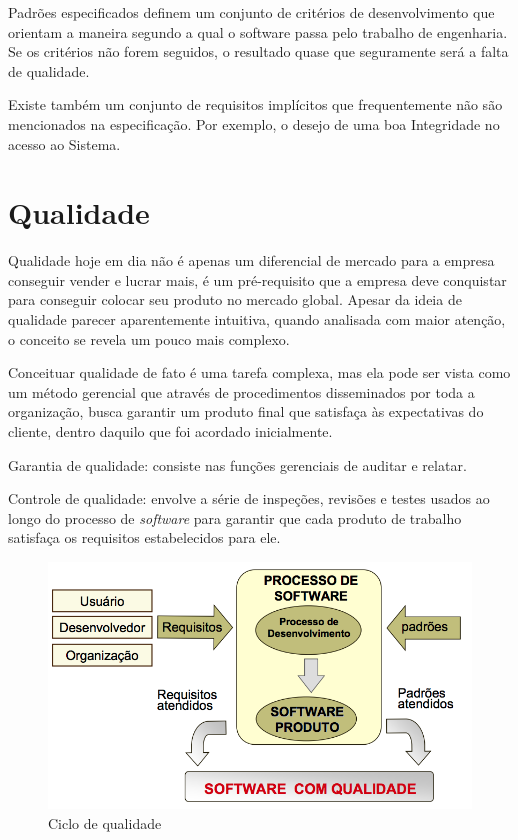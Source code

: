 Padrões especificados definem um conjunto de critérios de desenvolvimento que
orientam a maneira segundo a qual o software passa pelo trabalho de engenharia.
Se os critérios não forem seguidos, o resultado quase que seguramente será a falta
de qualidade.

Existe também um conjunto de requisitos implícitos que frequentemente não são mencionados na especificação. Por exemplo, o desejo de uma boa Integridade no acesso ao Sistema.

\section{Qualidade}

Qualidade hoje em dia não é apenas um diferencial de mercado para a empresa conseguir vender e lucrar mais, é um pré-requisito que a empresa deve conquistar para conseguir colocar seu produto no mercado global. Apesar da ideia de qualidade parecer aparentemente intuitiva, quando analisada com maior atenção, o conceito se revela um pouco mais complexo.

Conceituar qualidade de fato é uma tarefa complexa, mas ela pode ser vista como um método gerencial que através de procedimentos disseminados por toda a organização, busca garantir um produto final que satisfaça às expectativas do cliente, dentro daquilo que foi acordado inicialmente.

Garantia de qualidade: consiste nas funções gerenciais de auditar e relatar.

Controle de qualidade: envolve a série de inspeções, revisões e testes usados ao
longo do processo de \textit{software} para garantir que cada produto de trabalho satisfaça os requisitos estabelecidos para ele.

\begin{figure}[H]
    \centering
    \includegraphics[width=0.7\linewidth]{dados/figuras/qualidade}
    \caption{Ciclo de qualidade}
    \label{fig:qualidade}
\end{figure}

